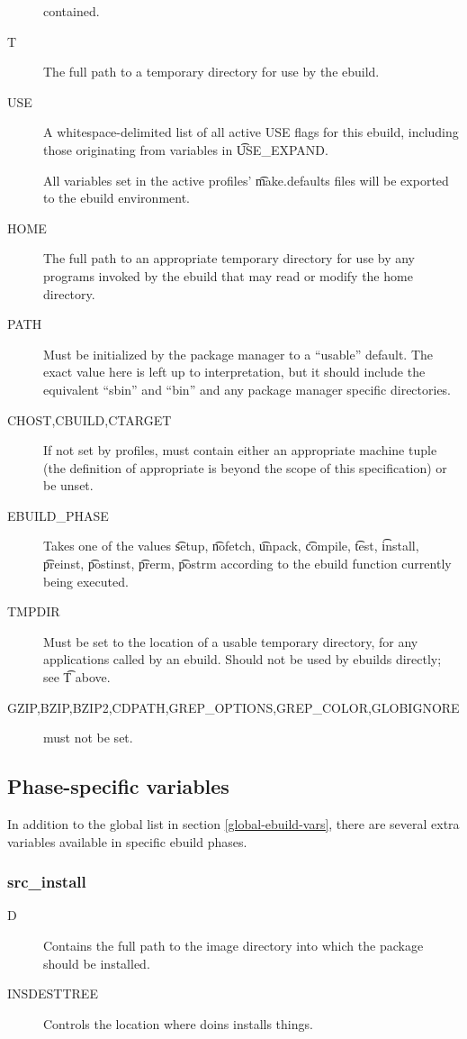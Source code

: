 \begin{description}
    contained. \label{env-var-WORKDIR}
\item[T] The full path to a temporary directory for use by the ebuild.
\item[USE] A whitespace-delimited list of all active USE flags for this ebuild, including those
    originating from variables in \t{USE\_EXPAND}.
\item[] All variables set in the active profiles' \t{make.defaults} files will be exported to the
    ebuild environment.
\item[HOME] The full path to an appropriate temporary directory for use by any programs invoked by
    the ebuild that may read or modify the home directory.
\item[PATH] Must be initialized by the package manager to a ``usable'' default.  The exact value here
    is left up to interpretation, but it should include the equivalent ``sbin'' and ``bin'' and any
    package manager specific directories.
\item[CHOST,CBUILD,CTARGET] If not set by profiles, must contain either an appropriate
    machine tuple (the definition of appropriate is beyond the scope of this specification) or
    be unset.
\item[EBUILD\_PHASE] Takes one of the values \t{setup}, \t{nofetch}, \t{unpack}, \t{compile},
    \t{test}, \t{install}, \t{preinst}, \t{postinst}, \t{prerm}, \t{postrm} according to the ebuild
    function currently being executed.
\item[TMPDIR] Must be set to the location of a usable temporary directory, for any applications
    called by an ebuild. Should not be used by ebuilds directly; see \t{T} above.
\item[GZIP,BZIP,BZIP2,CDPATH,GREP\_OPTIONS,GREP\_COLOR,GLOBIGNORE] must not be set.
\end{description}

\subsection{Phase-specific variables}

In addition to the global list in section \ref{global-ebuild-vars}, there are several extra
variables available in specific ebuild phases.

\subsubsection{src\_install}
\begin{description}
\item[D] Contains the full path to the image directory into which the package should be installed.
\item[INSDESTTREE] Controls the location where doins installs things.
\end{description}

